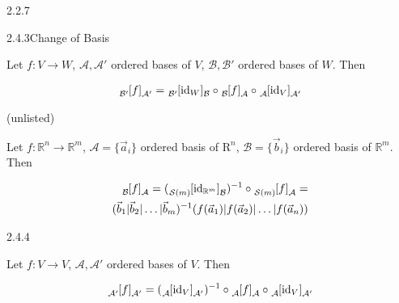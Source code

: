 \documentclass[10pt]{article} %
\begin{document}
\begin{multicols}{3}
\begin{theorem}{2.2.7}{}
\end{theorem}

\begin{theorem}{2.4.3}{Change of Basis}

    Let $f: V \to W$, $\mathcal{A},\mathcal{A}'$ ordered bases of $V$, $\mathcal{B},\mathcal{B}'$ ordered bases of $W$. Then

        \begin{align*}
            \tensor[_{\mathcal{B}'}]{[f]}{_{\mathcal{A}'}} = \tensor[_{\mathcal{B}'}]{[\mathrm{id}_W]}{_{\mathcal{B}}} \circ \tensor[_{\mathcal{B}}]{[f]}{_{\mathcal{A}}} \circ \tensor[_{\mathcal{A}}]{[\mathrm{id}_V]}{_{\mathcal{A}'}}
        \end{align*}

\end{theorem}

\begin{corollary}{(unlisted)}{}

    Let $f: \mathbb{R}^n \to \mathbb{R}^m$, $\mathcal{A} = \{\vec{a}_i\}$ ordered basis of $\mathrm{R}^n$, $\mathcal{B} = \{ \vec{b}_i \}$ ordered basis of $\mathbb{R}^m$. Then

        \begin{align*}
            \tensor[_{\mathcal{B}}]{[f]}{_{\mathcal{A}}} = (\tensor[_{\mathcal{S}(m)}]{[\mathrm{id}_{\mathbb{R}^m}]}{_{\mathcal{B}}})^{-1} \circ \tensor[_{\mathcal{S}(m)}]{[f]}{_{\mathcal{A}}} = \\
            (\vec{b}_1|\vec{b}_2|\hdots|\vec{b}_m)^{-1}(f(\vec{a}_1)|f(\vec{a}_2)|\hdots|f(\vec{a}_n))
        \end{align*}

\end{corollary}

\begin{theorem}{2.4.4}{}

    Let $f: V \to V$, $\mathcal{A},\mathcal{A}'$ ordered bases of $V$. Then

        \begin{align*}
            \tensor[_{\mathcal{A}'}]{[f]}{_{\mathcal{A}'}} = (\tensor[_{\mathcal{A}}]{[\mathrm{id}_V]}{_{\mathcal{A}'}})^{-1} \circ \tensor[_{\mathcal{A}}]{[f]}{_{\mathcal{A}}} \circ \tensor[_{\mathcal{A}}]{[\mathrm{id}_V]}{_{\mathcal{A}'}}
        \end{align*}

\end{theorem}


\end{multicols}
\end{document}
